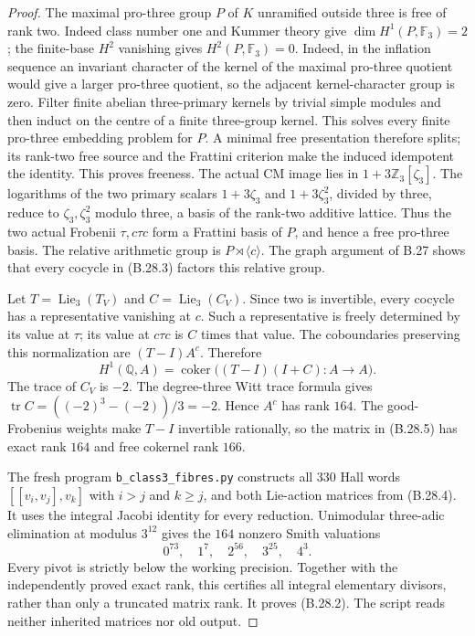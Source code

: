\begin{proof}
The maximal pro-three group $P$ of $K$ unramified outside
three is free of rank two. Indeed class number one and
Kummer theory give $\dim H^1(P,\mathbb F_3)=2$;
the finite-base $H^2$ vanishing gives
$H^2(P,\mathbb F_3)=0$. Indeed, in the inflation sequence an
invariant character of the kernel of the maximal
pro-three quotient would give a larger pro-three quotient,
so the adjacent kernel-character group is zero.
Filter finite abelian three-primary kernels by trivial
simple modules and then induct on the centre of a finite
three-group kernel. This solves every finite pro-three
embedding problem for $P$. A minimal free presentation
therefore splits; its rank-two free source and the
Frattini criterion make the induced idempotent the
identity. This proves freeness.
The actual CM image lies in $1+3\mathbb Z_3[\zeta_3]$.
The logarithms of the two primary scalars
$1+3\zeta_3$ and $1+3\zeta_3^2$, divided by three,
reduce to $\zeta_3,\zeta_3^2$ modulo three, a basis
of the rank-two additive lattice. Thus the two actual
Frobenii $\tau,c\tau c$ form a Frattini basis of $P$,
and hence a free pro-three basis.
The relative arithmetic group is $P\rtimes\langle c\rangle$.
The graph argument of B.27 shows that every cocycle in
(B.28.3) factors this relative group.

Let $T=\operatorname{Lie}_3(T_V)$ and
$C=\operatorname{Lie}_3(C_V)$.
Since two is invertible, every cocycle has a representative
vanishing at $c$. Such a representative is freely determined
by its value at $\tau$; its value at $c\tau c$ is $C$
times that value. The coboundaries preserving this
normalization are $(T-I)A^c$. Therefore
\[
 H^1(\mathbb Q,A)
   =\operatorname{coker}\bigl((T-I)(I+C):A\to A\bigr).
                                                               \tag{B.28.5}
\]
The trace of $C_V$ is $-2$. The degree-three Witt
trace formula gives
$\operatorname{tr}C=((-2)^3-(-2))/3=-2$.
Hence $A^c$ has rank $164$.
The good-Frobenius weights make $T-I$ invertible
rationally, so the matrix in (B.28.5) has exact rank
$164$ and free cokernel rank $166$.

The fresh program \texttt{b\_class3\_fibres.py} constructs
all $330$ Hall words $[[v_i,v_j],v_k]$ with $i>j$ and
$k\ge j$, and both Lie-action matrices from (B.28.4).
It uses the integral Jacobi identity for every reduction.
Unimodular three-adic elimination at modulus $3^{12}$
gives the $164$ nonzero Smith valuations
\[
              0^{73},\quad1^7,\quad2^{56},\quad3^{25},\quad4^3.
                                                               \tag{B.28.6}
\]
Every pivot is strictly below the working precision.
Together with the independently proved exact rank, this
certifies all integral elementary divisors, rather than
only a truncated matrix rank. It proves (B.28.2).
The script reads neither inherited matrices nor old output.
\end{proof}

